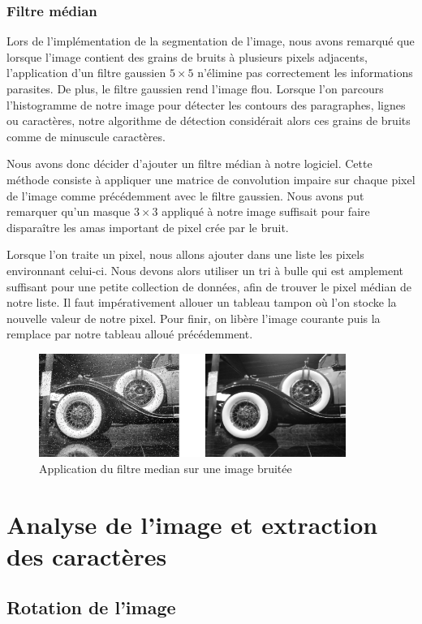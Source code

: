 \documentclass[11pt]{report}
\begin{document}
\subsection{Filtre médian}

Lors de l'implémentation de la segmentation de l'image, nous avons remarqué que lorsque l'image contient des grains de bruits à plusieurs pixels adjacents, l'application d'un filtre gaussien $5 \times 5$ n'élimine pas correctement les informations parasites. De plus, le filtre gaussien rend l'image flou. Lorsque l'on parcours l'histogramme de notre image pour détecter les contours des paragraphes, lignes ou caractères, notre algorithme de détection considérait alors ces grains de bruits comme de minuscule caractères.

Nous avons donc décider d'ajouter un filtre médian à notre logiciel. Cette méthode consiste à appliquer une matrice de convolution impaire sur chaque pixel de l'image comme précédemment avec le filtre gaussien. Nous avons put remarquer qu'un masque $3 \times 3$ appliqué à notre image suffisait pour faire disparaître les amas important de pixel crée par le bruit. 

Lorsque l'on traite un pixel, nous allons ajouter dans une liste les pixels environnant celui-ci. Nous devons alors utiliser un tri à bulle qui est amplement suffisant pour une petite collection de données, afin de trouver le pixel médian de notre liste. Il faut impérativement allouer un tableau tampon où l'on stocke la nouvelle valeur de notre pixel. Pour finir, on libère l'image courante puis la remplace par notre tableau alloué précédemment.

\begin{figure}[htbp]
\centering
\includegraphics[width=10cm]{filtre-median.png}
\caption{Application du filtre median sur une image bruitée}
\end{figure}

\chapter{Analyse de l'image et extraction des caractères}

\section{Rotation de l'image}
\end{document}
